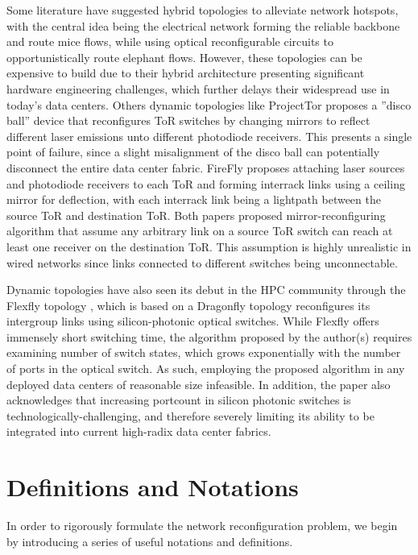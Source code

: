 \documentclass[sigconf]{acmart}
\begin{document}
Some literature have suggested hybrid topologies \cite{liu2015scheduling, farrington2011helios} to alleviate network hotspots, with the central idea being the electrical network forming the reliable backbone and route mice flows, while using optical reconfigurable circuits to opportunistically route elephant flows. However, these topologies can be expensive to build due to their hybrid architecture presenting significant hardware engineering challenges, which further delays their widespread use in today's data centers. Others dynamic topologies like ProjectTor \cite{ghobadi2016projector} proposes a ''disco ball'' device that reconfigures ToR switches by changing mirrors to reflect different laser emissions unto different photodiode receivers. This presents a single point of failure, since a slight misalignment of the disco ball can potentially disconnect the entire data center fabric. FireFly \cite{hamedazimi2014firefly} proposes attaching laser sources and photodiode receivers to each ToR and forming interrack links using a ceiling mirror for deflection, with each interrack link being a lightpath between the source ToR and destination ToR. Both papers proposed mirror-reconfiguring algorithm that assume any arbitrary link on a source ToR switch can reach at least one receiver on the destination ToR. This assumption is highly unrealistic in wired networks since links connected to different switches being unconnectable. 

Dynamic topologies have also seen its debut in the HPC community through the Flexfly topology \cite{wen2016flexfly}, which is based on a Dragonfly topology reconfigures its intergroup links using silicon-photonic optical switches. While Flexfly offers immensely short switching time, the algorithm proposed by the author(s) requires examining number of switch states, which grows exponentially with the number of ports in the optical switch. As such, employing the proposed algorithm in any deployed data centers of reasonable size infeasible. In addition, the paper also acknowledges that increasing portcount in silicon photonic switches is technologically-challenging, and therefore severely limiting its ability to be integrated into current high-radix data center fabrics. 



\section{Definitions and Notations}
In order to rigorously formulate the network reconfiguration problem, we begin by introducing a series of useful notations and definitions.
\end{document}
